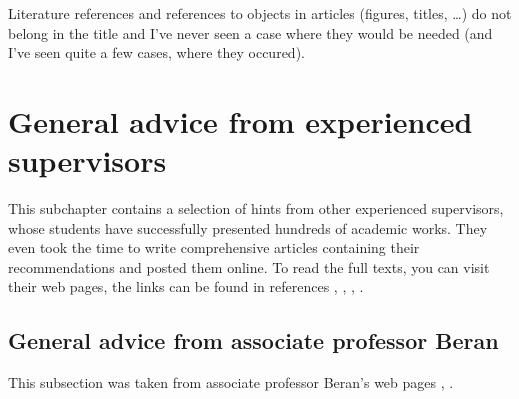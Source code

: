 Literature references and references to objects in articles (figures, titles, \ldots) do not belong in the title and I've never seen a case where they would be needed (and I've seen quite a few cases, where they occured).


\section{General advice from experienced supervisors}

This subchapter contains a selection of hints from other experienced supervisors, whose students have successfully presented hundreds of academic works. They even took the time to write comprehensive articles containing their recommendations and posted them online. To read the full texts, you can visit their web pages, the links can be found in references \cite{Beran}, \cite{BeranPDF}, \cite{Cernocky}, \cite{Zemcik}.

\subsection{General advice from associate professor Beran}

This subsection was taken from associate professor Beran's web pages \cite{Beran}, \cite{BeranPDF}.

